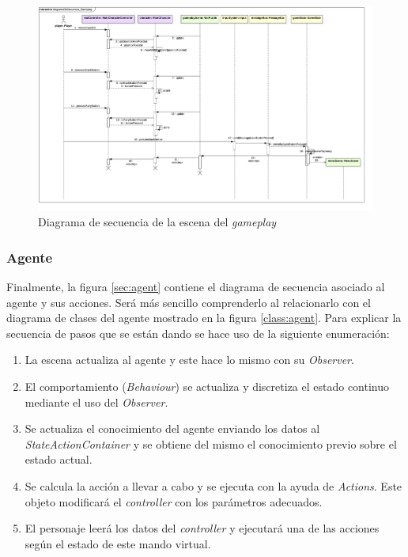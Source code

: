 \begin{figure}
	\centerline{\includegraphics[width=19cm]{otros/UML/png/alld/png/CasosDeUso__Especifico__Collaboration2__Interaction1__diagramaDeSecuencia_Gameplay_18.png}}
	\caption{Diagrama de secuencia de la escena del \textit{gameplay}}
	\label{sec:gameplay}
\end{figure}


\subsubsection*{Agente}


Finalmente, la figura \ref{sec:agent} contiene el diagrama de secuencia asociado al agente y sus acciones. Será más sencillo comprenderlo al relacionarlo con el diagrama de clases del agente mostrado en la figura \ref{class:agent}. Para explicar la secuencia de pasos que se están dando se hace uso de la siguiente enumeración:

\begin{enumerate}
	\item La escena actualiza al agente y este hace lo mismo con su \textit{Observer}.
	\item El comportamiento (\textit{Behaviour}) se actualiza y discretiza el estado continuo mediante el uso del \textit{Observer}.
	\item Se actualiza el conocimiento del agente enviando los datos al \textit{StateActionContainer} y se obtiene del mismo el conocimiento previo sobre el estado actual.
	\item Se calcula la acción a llevar a cabo y se ejecuta con la ayuda de \textit{Actions}. Este objeto modificará el \textit{controller} con los parámetros adecuados.
	\item El personaje leerá los datos del \textit{controller} y ejecutará una de las acciones según el estado de este mando virtual.
\end{enumerate}

